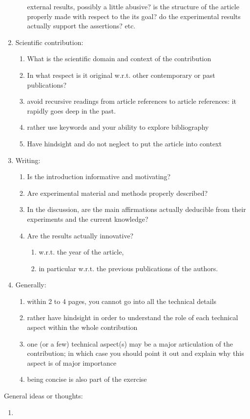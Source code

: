 \documentclass{article}
\begin{document}
\begin{enumerate}
\begin{enumerate}
            external results, possibly a little abusive? is the structure of
            the article properly made with respect to the its goal? do the
            experimental results actually support the assertions? etc.
        \end{enumerate}
        \item Scientific contribution:
        \begin{enumerate}
            \item What is the scientific domain and context of the contribution
            \item In what respect is it original w.r.t. other contemporary or past
            publications?
            \item avoid recursive readings from article references to article
            references: it rapidly goes deep in the past.
            \item rather use keywords and your ability to explore bibliography
            \item Have hindsight and do not neglect to put the article into
            context
        \end{enumerate}
        \item Writing:
        \begin{enumerate}
            \item Is the introduction informative and motivating?
            \item Are experimental material and methods properly described?
            \item In the discussion, are the main affirmations actually deducible
            from their experiments and the current knowledge?
            \item Are the results actually innovative?
            \begin{enumerate}
                \item w.r.t. the year of the article,
                \item in particular w.r.t. the previous publications of the authors.
            \end{enumerate}
        \end{enumerate}
        \item Generally:
        \begin{enumerate}
            \item within 2 to 4 pages, you cannot go into all the technical details
            \item rather have hindsight in order to understand the role of each
            technical aspect within the whole contribution
            \item one (or a few) technical aspect(s) may be a major articulation
            of the contribution; in which case you should point it out and explain why this
            aspect is of major importance
            \item being concise is also part of the exercise
        \end{enumerate}
    \end{enumerate}

    General ideas or thoughts:
    \begin{enumerate}
        \item 
    \end{enumerate}
    
    
\end{document}
